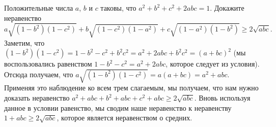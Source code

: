\problem
Положительные числа $a$, $b$ и $c$ таковы, что $a^2+b^2+c^2+2abc=1$.
Докажите неравенство
\[
    a \sqrt{(1 - b^2) (1 - c^2)}
    +
    b \sqrt{(1 - c^2) (1 - a^2)}
    +
    c \sqrt{(1 - a^2) (1 - b^2)}
\geq
    2 \sqrt{abc}
.\]
\solution
Заметим, что
\(
    (1 - b^2) (1 - c^2)
=
    1 - b^2 - c^2 + b^2 c^2
=
    a^2 + 2 a b c + b^2 c^2
=
    (a + b c)^2
\)
(мы воспользовались равенством $1 - b^2 - c^2 = a^2 + 2 a b c$, которое следует
из условия).
Отсюда получаем, что
\(a \sqrt{(1 - b^2) (1 - c^2)} = a (a + b c) = a^2 + a b c\).
Применяя это наблюдение ко всем трем слагаемым, мы получаем, что нам нужно
доказать неравенство
$a^2 + a b c + b^2 + a b c + c^2 + a b c \geq 2 \sqrt{a b c}$.
Вновь используя данное в условии равенство, мы сводим наше неравенство к
неравенству $1 + a b c \geq 2 \sqrt{a b c}$, которое является неравенством о
средних.
\endproblem
